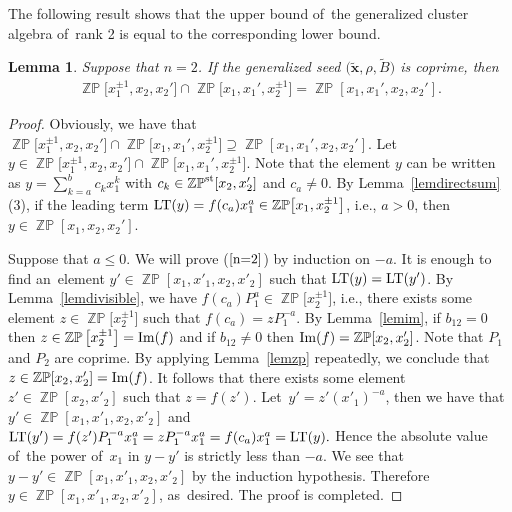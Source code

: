 \documentclass[pdftex]{sigma}
\numberwithin{equation}{section}
\newtheorem{Lemma}[Theorem]{Lemma}
\begin{document}
The following result shows that the upper bound of~the generalized cluster algebra of~rank 2 is equal to the corresponding lower bound.
\begin{Lemma}\label{lemn=2}
Suppose that $n=2$. If the generalized seed $\big(\widetilde{\mathbf{x}},\rho,\widetilde{B}\big)$ is coprime, then
\begin{gather}\label{n=2}
\mathop{\mathbb{ZP}}\!\big[x^{\pm1}_1,x_{2},x_{2}'\big]\cap\mathop{\mathbb{ZP}}\!\big[x_{1},x_{1}',x^{\pm1}_2\big] =\mathop{\mathbb{ZP}}[x_1,x_{1}',x_{2},x_{2}'].
\end{gather}
\end{Lemma}
\begin{proof}
Obviously, we have that $\mathop{\mathbb{ZP}}\!\big[x^{\pm1}_1,x_{2},x_{2}'\big]\cap\mathop{\mathbb{ZP}}\!\big[x_{1},x_{1}',x^{\pm1}_2\big] \supseteq\mathop{\mathbb{ZP}}[x_1,x_{1}',x_{2},x_{2}']$. Let~$y\in\mathop{\mathbb{ZP}}\!\big[x^{\pm1}_1,x_{2},x_{2}'\big]\cap\mathop{\mathbb{ZP}}\!\big[x_{1},x_{1}',x^{\pm1}_2\big]$. Note that the element $y$ can be written as $y=\sum\limits_{k=a}^{b}c_kx_{1}^{k}$ with $c_k\in\mathop{\mathbb{ZP}}\nolimits^{\rm st}[x_2,x'_2]$ and $c_a\neq0$. By Lemma~\ref{lemdirectsum} (3), if the leading term $\mathop{\rm LT}(y)=f(c_a)x^{a}_1\in\mathop{\mathbb{ZP}}\!\big[x_{1},x^{\pm1}_2\big]$, i.e., $a > 0$, then $y\in\mathop{\mathbb{ZP}}[x_1,x_{2},x_{2}']$.

Suppose that $a\leq0$. We will prove ($\ref{n=2}$) by induction on $-a$. It is enough to find an~element $y'\in\mathop{\mathbb{ZP}}[x_1,x'_1,x_2,x'_2]$ such that $\mathop{\rm LT}(y)=\mathop{\rm LT}(y')$. By Lemma~\ref{lemdivisible}, we have $f(c_a)P^{a}_1\in\mathop{\mathbb{ZP}}\big[x^{\pm1}_2\big]$, i.e., there exists some element $z\in\mathop{\mathbb{ZP}}\big[x^{\pm1}_2\big]$ such that $f(c_a)=zP^{-a}_1$. By Lemma~\ref{lemim}, if $b_{12}=0$ then $z\in\mathop{\mathbb{ZP}}\big[x^{\pm1}_2\big]=\mathop{\rm Im}(f)$ and if $b_{12}\neq0$ then $\mathop{\rm Im}(f)=\mathop{\mathbb{ZP}}[x_2,x'_2]$. Note that $P_1$ and $P_2$ are coprime. By applying Lemma~\ref{lemzp} repeatedly, we conclude that $z\in\mathop{\mathbb{ZP}}[x_2,x'_2]=\mathop{\rm Im}(f)$. It follows that there exists some element $z'\in \mathop{\mathbb{ZP}}[x_2,x'_2]$ such that $z=f(z')$. Let~$y'=z'(x'_1)^{-a}$, then we have that $y'\in\mathop{\mathbb{ZP}}[x_1,x'_1,x_2,x'_2]$ and
$
\mathop{\rm LT}(y')=f(z')P^{-a}_1x^{a}_1=zP^{-a}_1x^{a}_1=f(c_a)x^{a}_1=\mathop{\rm LT}(y).
$
Hence the absolute value of~the power of~$x_1$ in $y-y'$ is strictly less than $-a$. We see that $y-y'\in \mathop{\mathbb{ZP}}[x_1,x'_1,x_2,x'_2]$ by the induction hypothesis. Therefore $y\in \mathop{\mathbb{ZP}}[x_1,x'_1,x_2,x'_2]$, as~desired. The proof is completed.
\end{proof}
\end{document}
